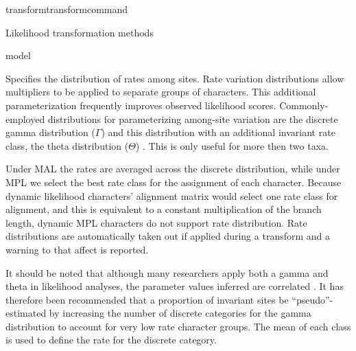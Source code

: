 \begin{command}{transform}{transformcommand}
\begin{arguments}
\begin{argumentgroup}{Likelihood transformation methods}
{\begin{description}
                \end{description}}
            {model}

                {Specifies the distribution of rates among sites. Rate
                variation distributions allow multipliers to be applied to
                separate groups of characters. This additional parameterization
                frequently improves observed likelihood scores.
                Commonly-employed distributions for parameterizing among-site
                variation are the discrete gamma distribution ($\Gamma$)
                \cite{yang1994a} and this distribution with an additional
                invariant rate class, the theta distribution ($\Theta$)
                \cite{gu1995}. This is only useful for more then two taxa.
                
                \begin{statement}
                    Under MAL the rates are averaged across the
                    discrete distribution, while under MPL we select the best
                    rate class for the assignment of each character. Because
                    dynamic likelihood characters' alignment matrix would select
                    one rate class for alignment, and this is equivalent to a
                    constant multiplication of the branch length, dynamic MPL
                    characters do not support rate distribution. Rate distributions are
                    automatically taken out if applied during a transform and a
                    warning to that affect is reported.
                \end{statement}

                \begin{statement}
                    It should be noted that although many researchers apply both
                    a gamma and theta in likelihood analyses, the parameter
                    values inferred are correlated \cite{sullivan1999}.  It has
                    therefore been recommended that a proportion of invariant
                    sites be ``pseudo''-estimated by increasing the number of
                    discrete categories for the gamma distribution to account
                    for very low rate character groups. The mean of each class
                    is used to define the rate for the discrete category.
                \end{statement}

                \begin{description}


\end{description}}
\end{argumentgroup}
\end{arguments}
\end{command}
